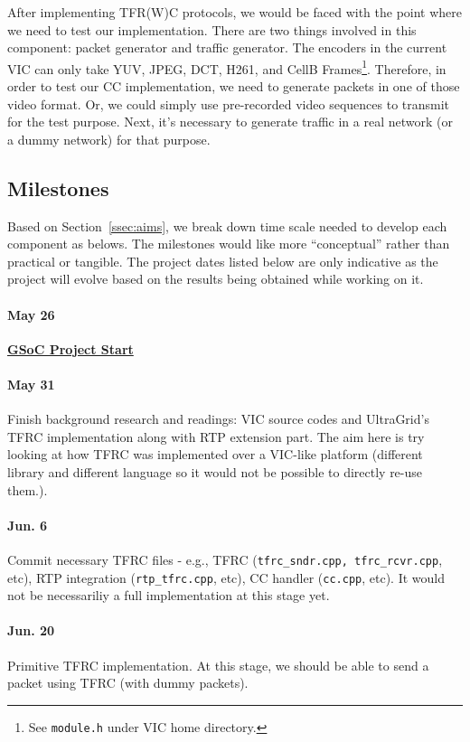 After implementing TFR(W)C protocols, we would be faced with the point where we
need to test our implementation. There are two things involved in this
component: packet generator and traffic generator. The encoders in the current
VIC can only take YUV, JPEG, DCT, H261, and CellB Frames\footnote{See
\texttt{module.h} under VIC home directory.}. Therefore, in order to test our CC
implementation, we need to generate packets in one of those video format. Or, we
could simply use pre-recorded video sequences to transmit for the test purpose.
Next, it's necessary to generate traffic in a real network (or a dummy network)
for that purpose.

\subsection{\label{ssec:plan}Milestones}

Based on Section~\ref{ssec:aims}, we break down time scale needed to develop
each component as belows. The milestones would like more ``conceptual'' rather
than practical or tangible. The project dates listed below are only indicative
as the project will evolve based on the results being obtained while working on
it.

\paragraph{\textsf{May 26}} \underline{\textbf{GSoC Project Start}}

\paragraph{\textsf{May 31}} Finish background research and readings: VIC source
codes and UltraGrid's TFRC implementation along with RTP extension part.  The
aim here is try looking at how TFRC was implemented over a VIC-like platform
(different library and different language so it would not be possible to
directly re-use them.).

\paragraph{\textsf{Jun. 6}} Commit necessary TFRC files - e.g., TFRC
(\texttt{tfrc\_sndr.cpp, tfrc\_rcvr.cpp}, etc), RTP integration
(\texttt{rtp\_tfrc.cpp}, etc), CC handler (\texttt{cc.cpp}, etc). It would not
be necessariliy a full implementation at this stage yet.

\paragraph{\textsf{Jun. 20}} Primitive TFRC implementation. At this stage, we
should be able to send a packet using TFRC (with dummy packets).

